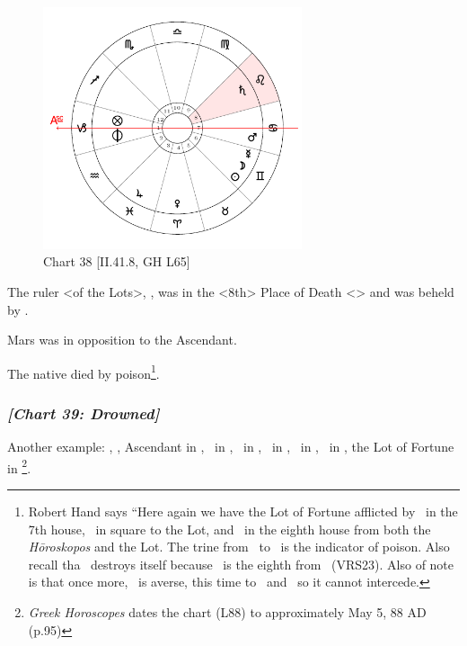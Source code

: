 \clearpage
\begin{figure}
\centering
\vspace{-20pt}
\includegraphics[width=0.68\textwidth]{charts/2_41_8}
\caption{Chart 38 [II.41.8, GH L65]}
\label{fig:chart38}
\end{figure} 
 
The ruler <of the Lots>, \Saturn, was in the <8th> Place of Death <\Leo> and was beheld by \Venus. \

Mars was in opposition to the Ascendant. 

The native died by poison\footnote{Robert Hand  says ``Here again we have the Lot of Fortune afflicted by \Mars\, in the 7th house, \Venus\, in square to the Lot, and \Saturn\, in the eighth house from both the \textsl{H\={o}roskopos} and the Lot. The trine from \Venus\, to \Saturn\, is the indicator of poison. Also recall tha \Venus\, destroys itself because \Taurus\, is the eighth from \Libra\, (VRS23). Also of note is that once more, \Jupiter\, is averse, this time to \Saturn\, and \Venus\, so it cannot intercede.}.
\newpage
\subsubsection{\textit{[Chart 39: Drowned]}}
Another example: \Sun, \Mercury, Ascendant in \Taurus, \Moon\, in \Pisces, \Saturn\, in \Gemini, \Jupiter\, in \Aquarius, \Mars\, in \Virgo, \Venus\, in \Aries, the Lot of Fortune in \Pisces
\footnote{\textit{Greek Horoscopes} dates the chart (L88) to approximately May 5, 88 AD (p.95)}.   


